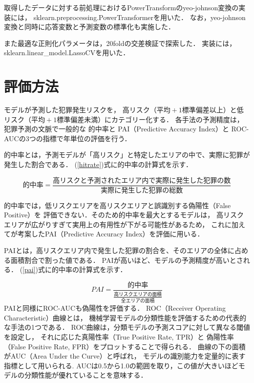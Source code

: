 \documentclass[12pt,a4paper,oneside]{jsbook}
\theoremstyle{plain}
\begin{document}
取得したデータに対する前処理におけるPowerTransformのyeo-johnson変換の実装には，
sklearn.preprocessing.PowerTransformer\citep{scikit-learn}を用いた．
なお，yeo-johnson変換と同時に応答変数と予測変数の標準化も実施した．

また最適な正則化パラメータは，20foldの交差検証\citep{islp}で探索した．
実装には，sklearn.linear\_model.LassoCV\cite{scikit-learn}を用いた．
\section{評価方法}
モデルが予測した犯罪発生リスクを，
高リスク（$平均+1標準偏差以上$）と低リスク（$平均+1標準偏差未満$）にカテゴリー化する．
各手法の予測精度は，犯罪予測の文脈で一般的な
的中率\citep{joshi2020considerationsdevelopingpredictivemodels}と
PAI（Predictive Accuracy Index）\citep{chainey2008utility}と
ROC-AUC\citep{islp}の3つの指標で年単位の評価を行う．

的中率とは，予測モデルが「高リスク」と特定したエリアの中で、実際に犯罪が発生した割合である．
(\ref{hitrate})式に的中率の計算式を示す．

\begin{equation}\label{hitrate}
  的中率=\frac{高リスクと予測されたエリア内で実際に発生した犯罪の数}{実際に発生した犯罪の総数}
\end{equation}

的中率では，低リスクエリアを高リスクエリアと誤識別する偽陽性（False Positive）を
評価できない．そのため的中率を最大とするモデルは，
高リスクエリアが広がりすぎて実用上の有用性が下がる可能性があるため，
これに加えて\citet{chainey2008utility}が考案したPAI（Predictive Accuracy Index）を評価に用いる．

PAIとは，高リスクエリア内で発生した犯罪の割合を、そのエリアの全体に占める面積割合で割った値である．
PAIが高いほど、モデルの予測精度が高いとされる．
(\ref{pai})式に的中率の計算式を示す．

\begin{equation}\label{pai}
  PAI=\frac{的中率}{\frac{高リスクエリアの面積}{全エリアの面積}}
\end{equation}
PAIと同様にROC-AUCも偽陽性を評価する．
ROC（Receiver Operating Characteristic）曲線とは，
機械学習モデルの分類性能を評価するための代表的な手法の1つである．
ROC曲線は，分類モデルの予測スコアに対して異なる閾値を設定し，
それに応じた真陽性率（True Positive Rate, TPR）と
偽陽性率（False Positive Rate, FPR）をプロットすることで得られる．
曲線の下の面積がAUC（Area Under the Curve）と呼ばれ，
モデルの識別能力を定量的に表す指標として用いられる.
AUCは0.5から1.0の範囲を取り，この値が大きいほどモデルの分類性能が優れていることを意味する．
\end{document}
